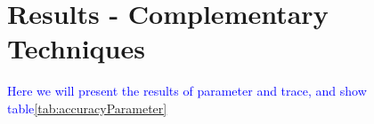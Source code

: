 \section{Results - Complementary Techniques}\label{sec:resultsTraceParameter}
\textcolor{blue}{Here we will present the results of parameter and trace, and show table\ref{tab:accuracyParameter}}

\begin{table*}[htb]
  \caption{Accuracy of the \mas in both techniques.}
  \label{tab:accuracyParameter}
\end{table*}